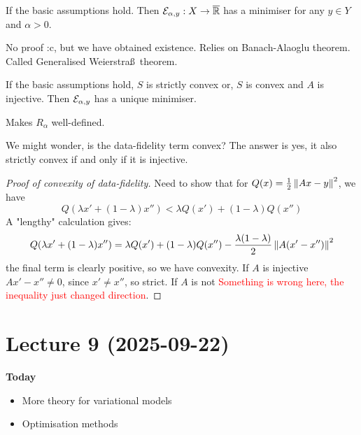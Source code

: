 \documentclass[12pt]{article}
\begin{document}
\begin{theorem}
    If the basic assumptions hold. Then $\mathcal{E}_{\alpha,y}:X\to \overline{\mathbb{R}}$ has a minimiser for any $y\in Y$ and $\alpha>0$. 
\end{theorem}
No proof :c, but we have obtained existence. Relies on Banach-Alaoglu theorem. Called Generalised Weierstra\ss~theorem.

\begin{theorem}
    If the basic assumptions hold, $S$ is strictly convex or, $S$ is convex and $A$ is injective. Then $\mathcal{E}_{\alpha,y}$ has a unique minimiser.
\end{theorem}
\begin{remark}
    Makes $R_\alpha$ well-defined.
\end{remark}
We might wonder, is the data-fidelity term convex? The answer is yes, it also strictly convex if and only if it is injective.
\begin{proof}[Proof of convexity of data-fidelity]
    Need to show that for $Q(x)=\frac{1}{2}\left\lVert Ax-y\right\rVert^2$, we have
    \begin{equation*}
        Q(\lambda x' + (1-\lambda)x'') < \lambda Q(x') + (1-\lambda)Q(x'')
    \end{equation*} 
    A "lengthy" calculation gives:
    \begin{equation*}
        Q(\lambda x' + (1-\lambda)x'') = \lambda Q(x') + (1-\lambda)Q(x'') - \frac{\lambda(1-\lambda)}{2}\left\lVert A(x'-x'')\right\rVert^2
    \end{equation*}
    the final term is clearly positive, so we have convexity. If $A$ is injective $Ax'-x''\neq 0$, since $x'\neq x''$, so strict. If $A$ is not \textcolor{red}{Something is wrong here, the inequality just changed direction}.
\end{proof}


\newpage

\section{Lecture 9 (2025-09-22)}
\textbf{Today}
\begin{itemize}
    \item More theory for variational models
    \item Optimisation methods
\end{itemize}
\end{document}

